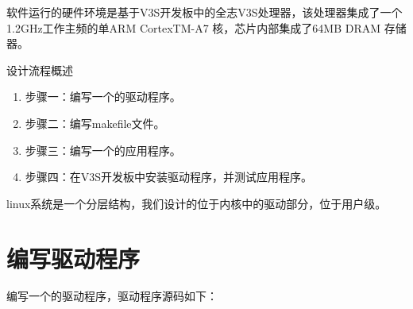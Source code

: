 \documentclass[lang=cn,newtx,10pt,scheme=chinese]{elegantbook}
\begin{document}
软件运行的硬件环境是基于V3S开发板中的全志V3S处理器，该处理器集成了一个1.2GHz工作主频的单ARM CortexTM-A7 核，芯片内部集成了64MB DRAM 存储器。

设计流程概述

\begin{enumerate}
    \item 步骤一：编写一个的驱动程序。
    \item 步骤二：编写makefile文件。
    \item 步骤三：编写一个的应用程序。
    \item 步骤四：在V3S开发板中安装驱动程序，并测试应用程序。
\end{enumerate}

linux系统是一个分层结构，我们设计的位于内核中的驱动部分，位于用户级。

\section{编写驱动程序}

编写一个的驱动程序，驱动程序源码如下：
\end{document}
